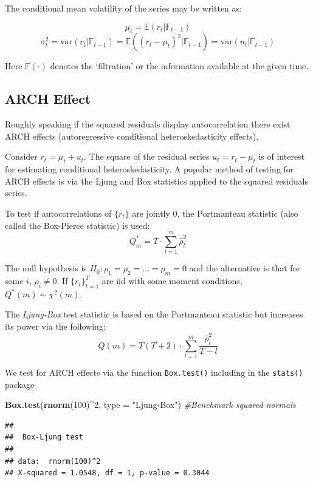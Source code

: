 \documentclass[11pt,]{article}
\newenvironment{Shaded}{\begin{snugshade}}{\end{snugshade}}
\newcommand{\KeywordTok}[1]{\textcolor[rgb]{0.13,0.29,0.53}{\textbf{#1}}}
\newcommand{\DataTypeTok}[1]{\textcolor[rgb]{0.13,0.29,0.53}{#1}}
\newcommand{\DecValTok}[1]{\textcolor[rgb]{0.00,0.00,0.81}{#1}}
\newcommand{\StringTok}[1]{\textcolor[rgb]{0.31,0.60,0.02}{#1}}
\newcommand{\CommentTok}[1]{\textcolor[rgb]{0.56,0.35,0.01}{\textit{#1}}}
\newcommand{\OperatorTok}[1]{\textcolor[rgb]{0.81,0.36,0.00}{\textbf{#1}}}
\newcommand{\NormalTok}[1]{#1}
\begin{document}
The conditional mean volatility of the series may be written as:

\[\mu_t = \mathbb{E}(r_t|\mathbb{F}_{t-1})\]
\[\sigma_t^2 = \text{var}(r_t|\mathbb{F}_{t-1}) = \mathbb{E}((r_t-\mu_t)^2|\mathbb{F}_{t-1})
=\text{var}(u_t|\mathbb{F}_{t-1})\]

Here \(\mathbb{F}(\cdot)\) denotes the `filtration' or the information
available at the given time.

\subsection{ARCH Effect}\label{arch-effect}

Roughly speaking if the squared residuals display autocorrelation there
exist ARCH effects (autoregressive conditional heteroskedasticity
effects).

Consider \(r_t = \mu_t + u_t\). The square of the residual series
\(u_t = r_t - \mu_t\) is of interest for estimating conditional
heteroskedasticity. A popular method of testing for ARCH effects is via
the Ljung and Box statistics applied to the squared residuals series.

To test if autocorrelations of \(\{r_t\}\) are jointly 0, the
Portmanteau statistic (also called the Box-Pierce statistic) is used:
\[Q^*_m = T\cdot\sum_{l=1}^m \hat{\rho}^2_l\]

The null hypothesis is \(H_0:\rho_1=\rho_2=\hdots=\rho_m=0\) and the
alternative is that for some \(i\), \(\rho_i\neq 0\). If
\(\{r_t\}_{t=1}^T\) are iid with some moment conditions,
\(Q^*(m)\sim\chi^2(m)\).

The \emph{Ljung-Box} test statistic is based on the Portmanteau
statistic but increases its power via the following:
\[Q(m)=T(T+2)\cdot\sum_{l=1}^m \frac{\hat{\rho}_l^2}{T-l}\]

We test for ARCH effects via the function \texttt{Box.test()} including
in the \texttt{stats()} package

\begin{Shaded}
\begin{Highlighting}[]
\KeywordTok{Box.test}\NormalTok{(}\KeywordTok{rnorm}\NormalTok{(}\DecValTok{100}\NormalTok{)}\OperatorTok{^}\DecValTok{2}\NormalTok{, }\DataTypeTok{type =} \StringTok{"Ljung-Box"}\NormalTok{) }\CommentTok{#Benchmark squared normals}
\end{Highlighting}
\end{Shaded}

\begin{verbatim}
## 
##  Box-Ljung test
## 
## data:  rnorm(100)^2
## X-squared = 1.0548, df = 1, p-value = 0.3044
\end{verbatim}
\end{document}
